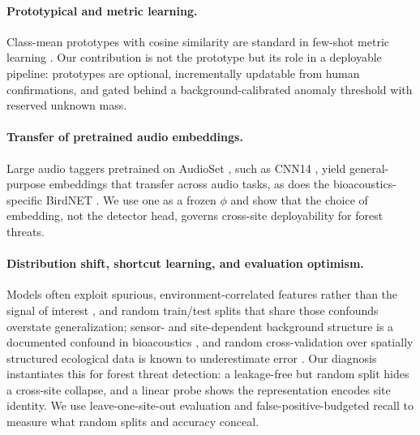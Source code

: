 \paragraph{Prototypical and metric learning.} Class-mean prototypes with cosine
similarity are standard in few-shot metric learning \citep{snell2017prototypical}. Our contribution is not the
prototype but its role in a deployable pipeline: prototypes are optional,
incrementally updatable from human confirmations, and gated behind a
background-calibrated anomaly threshold with reserved unknown mass.


\paragraph{Transfer of pretrained audio embeddings.} Large audio taggers pretrained on AudioSet \citep{gemmeke2017audioset}, such as
CNN14 \citep{kong2020panns}, yield general-purpose embeddings that transfer
across audio tasks, as does the bioacoustics-specific BirdNET
\citep{kahl2021birdnet}. We use one as a frozen $\phi$ and show that the choice of embedding,
not the detector head, governs cross-site deployability for forest threats.


\paragraph{Distribution shift, shortcut learning, and evaluation optimism.}
Models often exploit spurious, environment-correlated features rather than the
signal of interest \citep{geirhos2020shortcut}, and random train/test splits that share those confounds
overstate generalization; sensor- and site-dependent background structure is a
documented confound in bioacoustics \citep{lostanlen2019robust}, and random
cross-validation over spatially structured ecological data is known to
underestimate error \citep{roberts2017crossval}. Our diagnosis instantiates
this for forest threat detection: a leakage-free but random split hides a
cross-site collapse, and a linear probe shows the representation encodes site
identity. We use leave-one-site-out evaluation and false-positive-budgeted recall
to measure what random splits and accuracy conceal.

